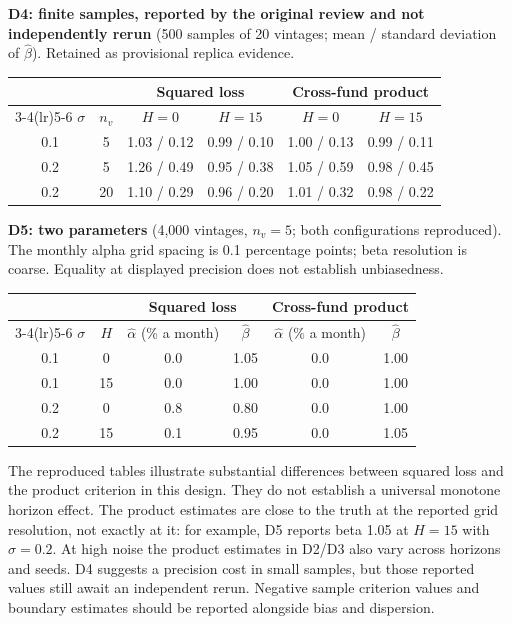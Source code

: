 \documentclass[11pt]{article}
\theoremstyle{plain}
\theoremstyle{definition}
\begin{document}
\textbf{D4: finite samples, reported by the original review and not independently rerun} (500 samples of 20 vintages; mean / standard deviation of $\hat\beta$). Retained as provisional replica evidence.
\begin{center}
\small
\begin{tabular}{cc cccc}
\toprule
& & \multicolumn{2}{c}{Squared loss} & \multicolumn{2}{c}{Cross-fund product}\\
\cmidrule(lr){3-4}\cmidrule(lr){5-6}
$\sigma$ & $n_v$ & $H=0$ & $H=15$ & $H=0$ & $H=15$\\
\midrule
0.1 & 5 & 1.03 / 0.12 & 0.99 / 0.10 & 1.00 / 0.13 & 0.99 / 0.11\\
0.2 & 5 & 1.26 / 0.49 & 0.95 / 0.38 & 1.05 / 0.59 & 0.98 / 0.45\\
0.2 & 20 & 1.10 / 0.29 & 0.96 / 0.20 & 1.01 / 0.32 & 0.98 / 0.22\\
\bottomrule
\end{tabular}
\end{center}

\textbf{D5: two parameters} (4{,}000 vintages, $n_v=5$; both configurations reproduced). The monthly alpha grid spacing is 0.1 percentage points; beta resolution is coarse. Equality at displayed precision does not establish unbiasedness.
\begin{center}
\small
\begin{tabular}{cc cc cc}
\toprule
& & \multicolumn{2}{c}{Squared loss} & \multicolumn{2}{c}{Cross-fund product}\\
\cmidrule(lr){3-4}\cmidrule(lr){5-6}
$\sigma$ & $H$ & $\hat\alpha$ (\% a month) & $\hat\beta$ & $\hat\alpha$ (\% a month) & $\hat\beta$\\
\midrule
0.1 & 0 & 0.0 & 1.05 & 0.0 & 1.00\\
0.1 & 15 & 0.0 & 1.00 & 0.0 & 1.00\\
0.2 & 0 & 0.8 & 0.80 & 0.0 & 1.00\\
0.2 & 15 & 0.1 & 0.95 & 0.0 & 1.05\\
\bottomrule
\end{tabular}
\end{center}


The reproduced tables illustrate substantial differences between squared loss and the product criterion in this design. They do not establish a universal monotone horizon effect. The product estimates are close to the truth at the reported grid resolution, not exactly at it: for example, D5 reports beta 1.05 at $H=15$ with $\sigma=0.2$. At high noise the product estimates in D2/D3 also vary across horizons and seeds. D4 suggests a precision cost in small samples, but those reported values still await an independent rerun. Negative sample criterion values and boundary estimates should be reported alongside bias and dispersion.
\end{document}
